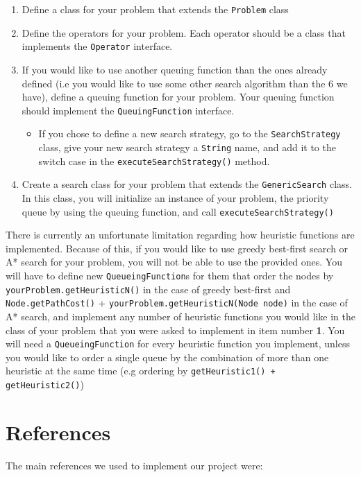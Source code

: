 \documentclass{article}
\begin{document}
\begin{enumerate}
\item Define a class for your problem that extends the \texttt{Problem} class
\item Define the operators for your problem. Each operator should be a class that implements the \texttt{Operator} interface.
\item If you would like to use another queuing function than the ones already defined (i.e you would like to use some other search algorithm than the 6 we have), define a queuing function for your problem. Your queuing function should implement the \texttt{QueuingFunction} interface.

\begin{itemize}
\item If you chose to define a new search strategy, go to the \texttt{SearchStrategy} class, give your new search strategy a \texttt{String} name, and add it to the switch case in the \texttt{executeSearchStrategy()} method.
\end{itemize}

\item Create a search class for your problem that extends the \texttt{GenericSearch} class. In this class, you will initialize an instance of your problem, the priority queue by using the queuing function, and call \texttt{executeSearchStrategy()}
\end{enumerate}

There is currently an unfortunate limitation regarding how heuristic functions are implemented. Because of this, if you would like to use greedy best-first search or A* search for your problem, you will not be able to use the provided ones. You will have to define new \texttt{QueueingFunction}s for them that order the nodes by \texttt{yourProblem.getHeuristicN()} in the case of greedy best-first and \texttt{Node.getPathCost()} + \texttt{yourProblem.getHeuristicN(Node node)} in the case of A* search, and implement any number of heuristic functions you would like in the class of your problem that you were asked to implement in item number \textbf{1}. You will need a \texttt{QueueingFunction} for every heuristic function you implement, unless you would like to order a single queue by the combination of more than one heuristic at the same time (e.g ordering by \texttt{getHeuristic1() + getHeuristic2()})

\section{References}
The main references we used to implement our project were: 
\end{document}
